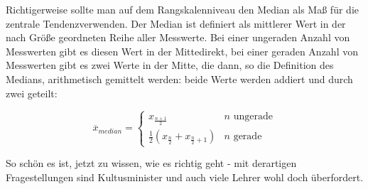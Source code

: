 Richtigerweise sollte man auf dem Rangskalenniveau den Median als Maß für die  \glqq zentrale Tendenz\grqq verwenden. Der Median ist definiert als mittlerer Wert in der nach Größe geordneten Reihe aller Messwerte. Bei einer ungeraden Anzahl von Messwerten gibt es diesen \glqq Wert in der Mitte\grqq direkt, bei einer geraden Anzahl von Messwerten gibt es zwei Werte in der Mitte, die dann, so die Definition des Medians, arithmetisch gemittelt werden: beide Werte werden addiert und durch zwei geteilt: 

\begin{equation}
    \overline{x}_{median}=
    \begin{cases}
        x_{\frac{n+1}{2}} & \text{$n$ ungerade}\\
        \frac{1}{2}(x_{\frac{n}{2}}+x_{\frac{n}{2}+1}) & \text{$n$ gerade}
      \end{cases}
\end{equation}

So schön es ist, jetzt zu wissen, wie es richtig geht - mit derartigen Fragestellungen sind Kultusminister und auch viele Lehrer wohl doch überfordert.